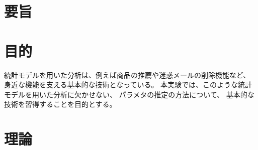 \documentclass[12pt]{jarticle}
\begin{document}



\section{要旨}


\section{目的}
統計モデルを用いた分析は、例えば商品の推薦や迷惑メールの削除機能など、
身近な機能を支える基本的な技術となっている。
本実験では、このような統計モデルを用いた分析に欠かせない、
パラメタの推定の方法について、
基本的な技術を習得することを目的とする。

\section{理論}
\end{document}
